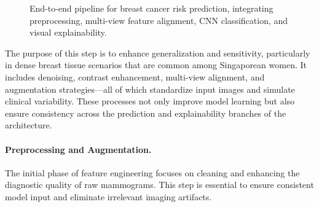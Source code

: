 \documentclass[12pt]{article}
\begin{document}
\begin{figure}[H]
    \centering
    \caption{End-to-end pipeline for breast cancer risk prediction, integrating preprocessing, multi-view feature alignment, CNN classification, and visual explainability.}
    \label{fig:end_to_end_pipeline}
\end{figure}

The purpose of this step is to enhance generalization and sensitivity, particularly in dense breast tissue scenarios that are common among Singaporean women. It includes denoising, contrast enhancement, multi-view alignment, and augmentation strategies—all of which standardize input images and simulate clinical variability. These processes not only improve model learning but also ensure consistency across the prediction and explainability branches of the architecture.

\paragraph{Preprocessing and Augmentation.}
The initial phase of feature engineering focuses on cleaning and enhancing the diagnostic quality of raw mammograms. This step is essential to ensure consistent model input and eliminate irrelevant imaging artifacts.
\end{document}
